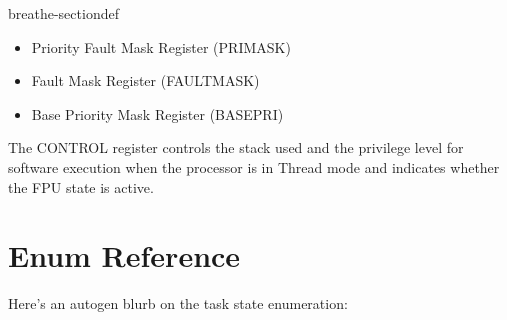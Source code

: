 \documentclass[letterpaper,10pt,english]{sphinxmanual}
\begin{document}
\begin{fulllineitems}
\begin{sphinxuseclass}{breathe-sectiondef}
\begin{fulllineitems}
\sphinxAtStartPar
\begin{itemize}
\item {} 
\sphinxAtStartPar
Priority Fault Mask Register (PRIMASK)

\item {} 
\sphinxAtStartPar
Fault Mask Register (FAULTMASK)

\item {} 
\sphinxAtStartPar
Base Priority Mask Register (BASEPRI) 

\end{itemize}


\end{fulllineitems}


\begin{fulllineitems}
\label{\detokenize{source_code:_CPPv4N16coreRegistersDef16control_registerE}}\label{\detokenize{source_code:_CPPv3N16coreRegistersDef16control_registerE}}\label{\detokenize{source_code:_CPPv2N16coreRegistersDef16control_registerE}}\label{\detokenize{source_code:coreRegistersDef::control_register__uint32_t}}
\pysigstartsignatures
\pysigstartmultiline
{}
\pysigstopmultiline
\pysigstopsignatures
\sphinxAtStartPar
The CONTROL register controls the stack used and the privilege level for software execution when the processor is in Thread mode and indicates whether the FPU state is active. 

\end{fulllineitems}


\end{sphinxuseclass}
\end{fulllineitems}



\section{Enum Reference}
\label{\detokenize{source_code:enum-reference}}
\sphinxAtStartPar
Here’s an auto\sphinxhyphen{}gen blurb on the task state enumeration:
\end{document}
